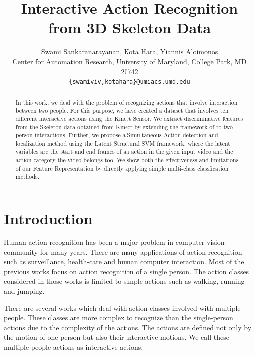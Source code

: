 \documentclass[10pt,twocolumn,letterpaper]{article}
\begin{document}
\title{Interactive Action Recognition from 3D Skeleton Data}

\author{Swami Sankaranarayanan, Kota Hara, Yiannis Aloimonos\\
Center for Automation Research, University of Maryland, College Park, MD 20742\\
{\tt\small \{swamiviv,kotahara\}@umiacs.umd.edu}
}


\maketitle

\begin{abstract}
In this work, we deal with the problem of recognizing actions that involve interaction between two people. For this purpose, we have created a dataset that involves ten different interactive actions using the Kinect Sensor. We extract discriminative features from the Skeleton data obtained from Kinect by extending the framework of \cite{Vemulapalli2013} to two person interactions. Further, we propose a Simultaneous Action detection and localization method using the Latent Structural SVM framework, where the latent variables are the start and end frames of an action in the given input video and the action category the video belongs too. We show both the effectiveness and limitations of our Feature Representation by directly applying simple multi-class classfication methods.
   
\end{abstract}

\section{Introduction}
Human action recognition has been a major problem in computer vision community for many years. There are many applications of action recognition such as surveillance, health-care and human computer interaction. Most of the previous works focus on action recognition of a single person. The action classes considered in those works is limited to simple actions such as walking, running and jumping. 

There are several works which deal with action classes involved with multiple people. These classes are more complex to recognize than the single-person actions due to the complexity of the actions. The actions are defined not only by the motion of one person but also their interactive motions. We call these multiple-people actions as interactive actions.
\end{document}
